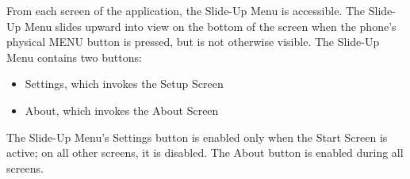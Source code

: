 \documentclass[11pt]{article}
\newcommand{\bt}[1]{{\sc #1}}
\begin{document}
From each screen of the application, the Slide-Up Menu is accessible. The Slide-Up Menu slides upward into view on the bottom of the screen when the phone's physical MENU button is pressed, but is not otherwise visible. The Slide-Up Menu contains two buttons:
\begin{itemize}
	\item{\bt{Settings}, which invokes the Setup Screen}
	\item{\bt{About}, which invokes the About Screen}
\end{itemize}

The Slide-Up Menu's \bt{Settings} button is enabled only when the Start Screen is active; on all other screens, it is disabled. The \bt{About} button is enabled during all screens.
\end{document}
